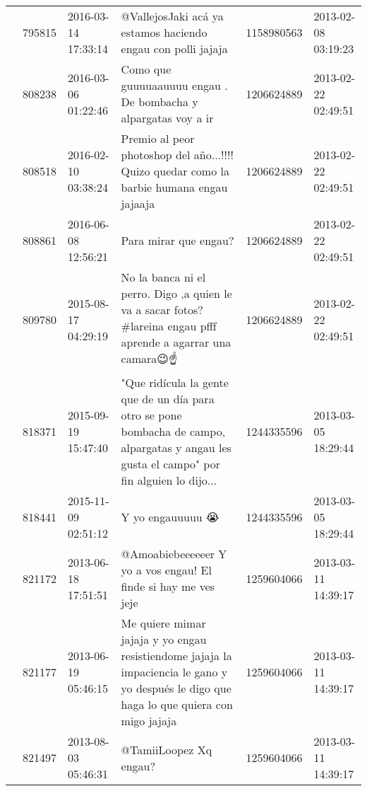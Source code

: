 \begin{tabular}{llllrl}
           & 795815  & 2016-03-14 17:33:14 &                                                                                 @VallejosJaki acá ya estamos haciendo engau con polli jajaja &  1158980563 & 2013-02-08 03:19:23 \\
           & 808238  & 2016-03-06 01:22:46 &                                                                             Como que guuuuaauuuu engau . De bombacha y alpargatas voy a ir 🙅 &  1206624889 & 2013-02-22 02:49:51 \\
           & 808518  & 2016-02-10 03:38:24 &                                                     Premio al peor photoshop del año...!!!! Quizo quedar como la barbie humana engau jajaaja &  1206624889 & 2013-02-22 02:49:51 \\
           & 808861  & 2016-06-08 12:56:21 &                                                                                                                        Para mirar que engau? &  1206624889 & 2013-02-22 02:49:51 \\
           & 809780  & 2015-08-17 04:29:19 &                               No la banca ni el perro. Digo ,a quien le va a sacar fotos? \#lareina engau pfff aprende a agarrar una camara😉☝ &  1206624889 & 2013-02-22 02:49:51 \\
           & 818371  & 2015-09-19 15:47:40 &  "Que ridícula la gente que de un día para otro se pone bombacha de campo, alpargatas y angau les gusta el campo" por fin alguien lo dijo... &  1244335596 & 2013-03-05 18:29:44 \\
           & 818441  & 2015-11-09 02:51:12 &                                                                                                                             Y yo engauuuuu 😭 &  1244335596 & 2013-03-05 18:29:44 \\
           & 821172  & 2013-06-18 17:51:51 &                                                                               @Amoabiebeeeeeer Y yo a vos engau! El finde si hay me ves jeje &  1259604066 & 2013-03-11 14:39:17 \\
           & 821177  & 2013-06-19 05:46:15 &    Me quiere mimar jajaja y yo engau resistiendome jajaja la impaciencia le gano y yo después le digo que haga lo que quiera con migo jajaja &  1259604066 & 2013-03-11 14:39:17 \\
           & 821497  & 2013-08-03 05:46:31 &                                                                                                                       @TamiiLoopez Xq engau? &  1259604066 & 2013-03-11 14:39:17 \\

\end{tabular}
